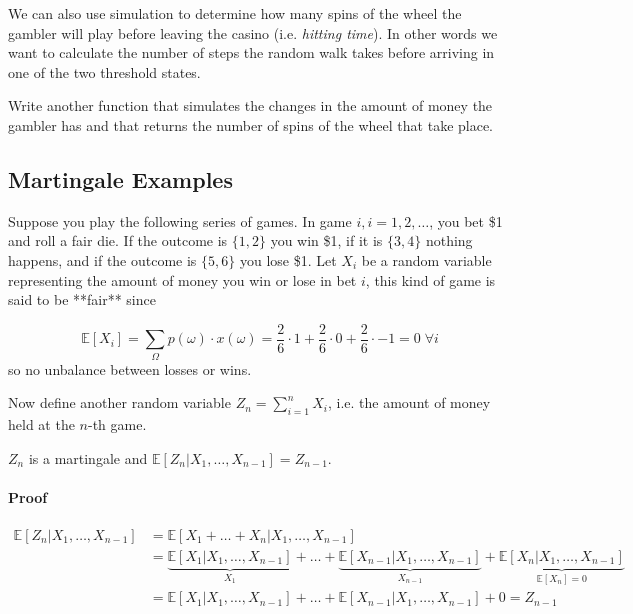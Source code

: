 \documentclass[12pt,a4paper]{article}
\begin{document}
We can also use simulation to determine how many spins of the wheel the gambler will play before leaving the casino (i.e. \emph{hitting time}).
In other words we want to calculate the number of steps the random walk takes before arriving in one of the two threshold states.

\begin{question}
Write another function that simulates the changes in the amount of money the gambler has and that returns the number of spins of the wheel that take place.
\end{question}

\subsection{Martingale Examples}
Suppose you play the following series of games. In game $i, i = 1, 2,\ldots$, you bet \$1 and roll a fair die. If the outcome is $\{1,2\}$ you win \$1, if it is $\{3,4\}$ nothing happens, and if the outcome is $\{5,6\}$ you lose \$1.
Let $X_i$ be a random variable representing the amount of money you win or lose in bet $i$, this kind of game is said to be **fair** since

$$\mathbb{E}[X_i]= \sum_{\Omega}p(\omega)\cdot x(\omega) = \frac{2}{6}\cdot 1 + \frac{2}{6}\cdot 0 + \frac{2}{6}\cdot -1 = 0\;\forall i$$
so no unbalance between losses or wins.

Now define another random variable $Z_n = \sum_{i=1}^{n} X_i$, i.e. the amount of money held at the $n$-th game.

$Z_n$ is a martingale and $\mathbb{E}[Z_n|X_1,\ldots, X_{n-1}] = Z_{n-1}$.

\paragraph{Proof}

\begin{equation*}
	\begin{aligned}
		\mathbb{E}[Z_n|X_1,\ldots, X_{n-1}] &= \mathbb{E}[X_1 +\ldots + X_n|X_1,\ldots, X_{n-1}] \\
		& = \underbrace{\mathbb{E}[X_1|X_1,\ldots, X_{n-1}]}_{X_1} + \ldots + \underbrace{\mathbb{E}[X_{n-1}|X_1,\ldots, X_{n-1}]}_{X_{n-1}} + \underbrace{\mathbb{E}[X_n|X_1,\ldots, X_{n-1}]}_{\mathbb{E}[X_n]=0} \\
		& = \mathbb{E}[X_1|X_1,\ldots, X_{n-1}] + \ldots + \mathbb{E}[X_{n-1}|X_1,\ldots, X_{n-1}] + 0 = Z_{n-1}
	\end{aligned}
\end{equation*}
\end{document}
